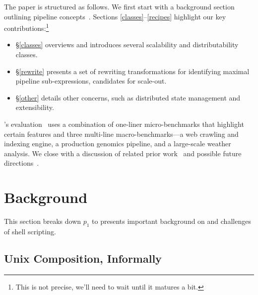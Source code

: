 \documentclass[sigplan,10pt,review,anonymous]{acmart}
\begin{document}
The paper is structured as follows.
We first start with a background section outlining pipeline concepts~.
Sections \ref{classes}--\ref{recipes} highlight our key contributions:\footnote{
  This is not precise, we'll need to wait until it matures a bit.
}
\begin{itemize}

  \item
  \S\ref{classes} overviews \sys and introduces several scalability and distributability classes.

  \item
  \S\ref{rewrite} presents a set of rewriting transformations for identifying maximal pipeline sub-expressions, candidates for scale-out.

  \item
  \S\ref{other} details other concerns, such as distributed state management and extensibility.
\end{itemize}

\noindent
\sys's evaluation~ uses a combination of one-liner micro-benchmarks that highlight certain features and three multi-line macro-benchmarks---a web crawling and indexing engine, a production genomics pipeline, and a large-scale weather analysis.
We close with a discussion of related prior work~ and possible future directions~.

% 

\section{Background}
\label{bg}

This section breaks down $p_1$ to presents important background on and challenges
of shell scripting.

\subsection{Unix Composition, Informally}
\label{bg:pipelines}
\end{document}
